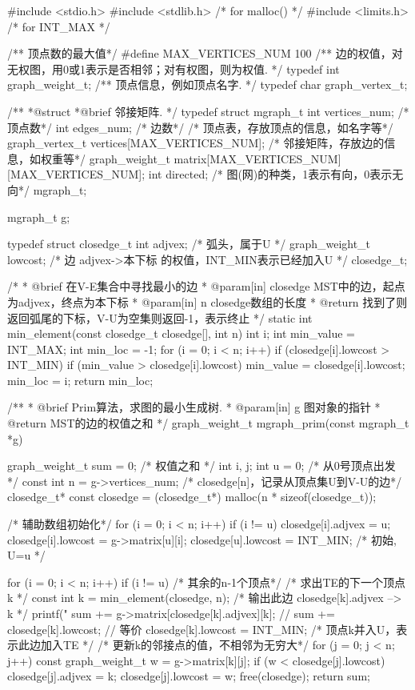 \begin{Codex}[label=mgraph_prim1.c]
#include <stdio.h>
#include <stdlib.h>  /* for malloc() */
#include <limits.h>  /* for INT_MAX */

/** 顶点数的最大值*/
#define MAX_VERTICES_NUM 100
/** 边的权值，对无权图，用0或1表示是否相邻；对有权图，则为权值. */
typedef int graph_weight_t;
/** 顶点信息，例如顶点名字. */
typedef char graph_vertex_t;

/**
 *@struct
 *@brief 邻接矩阵.
 */
typedef struct mgraph_t {
    int vertices_num; /* 顶点数*/
    int edges_num; /* 边数*/
    /* 顶点表，存放顶点的信息，如名字等*/
    graph_vertex_t vertices[MAX_VERTICES_NUM];
    /* 邻接矩阵，存放边的信息，如权重等*/
    graph_weight_t matrix[MAX_VERTICES_NUM][MAX_VERTICES_NUM];
    int directed; /* 图(网)的种类，1表示有向，0表示无向*/
} mgraph_t;

mgraph_t g;

typedef struct closedge_t {
    int adjvex; /* 弧头，属于U */
    graph_weight_t lowcost; /* 边 adjvex->本下标 的权值，INT_MIN表示已经加入U */
} closedge_t;

/*
 * @brief 在V-E集合中寻找最小的边
 * @param[in] closedge MST中的边，起点为adjvex，终点为本下标
 * @param[in] n closedge数组的长度
 * @return 找到了则返回弧尾的下标，V-U为空集则返回-1，表示终止
 */
static int min_element(const closedge_t closedge[], int n) {
    int i;
    int min_value = INT_MAX;
    int min_loc = -1;
    for (i = 0; i < n; i++)
        if (closedge[i].lowcost > INT_MIN) {
            if (min_value > closedge[i].lowcost) {
                min_value = closedge[i].lowcost;
                min_loc = i;
            }
        }
    return min_loc;
}

/**
 * @brief Prim算法，求图的最小生成树.
 * @param[in] g 图对象的指针
 * @return MST的边的权值之和
 */
graph_weight_t mgraph_prim(const mgraph_t *g) {
    graph_weight_t sum = 0; /* 权值之和 */
    int i, j;
    int u = 0; /* 从0号顶点出发 */
    const int n = g->vertices_num;
    /* closedge[n]，记录从顶点集U到V-U的边*/
    closedge_t* const closedge = (closedge_t*) malloc(n * sizeof(closedge_t));

    /* 辅助数组初始化*/
    for (i = 0; i < n; i++) if (i != u) {
        closedge[i].adjvex = u;
        closedge[i].lowcost = g->matrix[u][i];
    }
    closedge[u].lowcost = INT_MIN; /* 初始, U={u} */

    for (i = 0; i < n; i++) if (i != u) { /* 其余的n-1个顶点*/
        /* 求出TE的下一个顶点k */
        const int k = min_element(closedge, n);
        /* 输出此边 closedge[k].adjvex --> k */
        printf("%
        sum += g->matrix[closedge[k].adjvex][k];
        // sum += closedge[k].lowcost;  // 等价
        closedge[k].lowcost = INT_MIN;  /* 顶点k并入U，表示此边加入TE */
        /* 更新k的邻接点的值，不相邻为无穷大*/
        for (j = 0; j < n; j++) {
            const graph_weight_t w = g->matrix[k][j];
            if (w < closedge[j].lowcost) {
                closedge[j].adjvex = k;
                closedge[j].lowcost = w;
            }
        }
    }
    free(closedge);
    return sum;
}


\end{Codex}
